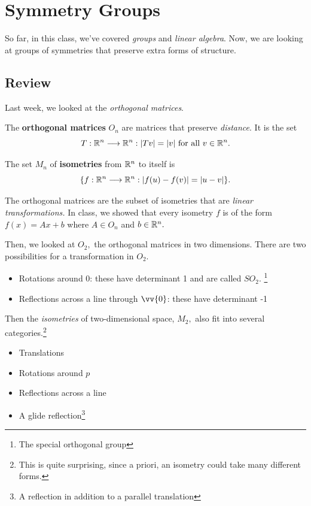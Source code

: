 
\section{Symmetry Groups}

So far, in this class, we've covered \emph{groups} and \emph{linear algebra}. Now, we are looking at groups of symmetries that preserve extra forms of structure. 

\subsection{Review}
Last week, we looked at the \emph{orthogonal matrices}. 
 
\begin{definition}
The \textbf{orthogonal matrices} $O_n$ are matrices that preserve \emph{distance}. It is the set 
\[
T: \mathbb R^n \longrightarrow \mathbb R^n : |Tv| = |v| \text{ for all } v \in \mathbb R^n.
\]
\end{definition}

\begin{definition}
The set $M_n$ of \textbf{isometries} from $\mathbb R^n$ to itself is 
\[
\{f: \mathbb R^n \longrightarrow \mathbb R^n : |f(u)-f(v)| = |u-v|\}.
\]
\end{definition}

The orthogonal matrices are the subset of isometries that are \emph{linear transformations.} In class, we showed that every isometry $f$ is of the form $f(x) = Ax + b$ where $A \in O_n$ and $b \in \mathbb R^n.$

Then, we looked at $O_2,$ the orthogonal matrices in two dimensions. There are two possibilities for a transformation in $O_2.$
\begin{itemize}
    \item Rotations around $0$: these have determinant 1 and are called $SO_2$. \footnote{The special orthogonal group}
    \item Reflections across a line through $\vv{0}$: these have determinant -1
\end{itemize}

Then the \emph{isometries} of two-dimensional space, $M_2,$ also fit into several categories.\footnote{This is quite surprising, since a priori, an isometry could take many different forms.}
\begin{itemize}
    \item Translations
    \item Rotations around $p$ 
    \item Reflections across a line
    \item A glide reflection\footnote{A reflection in addition to a parallel translation}
\end{itemize}

